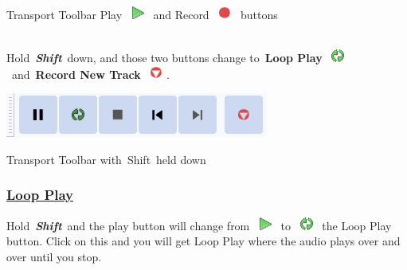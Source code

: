 \documentclass[letterpaper]{article}
\begin{document}
Transport Toolbar Play~ \includegraphics[width=0.423cm,height=0.423cm]{TourGuide-img001.png} ~and Record~
\includegraphics[width=0.423cm,height=0.423cm]{TourGuide-img002.png} ~buttons

{\color{black}
~\\
\newline
Hold~\textbf{\textit{Shift}}~down, and those two buttons change to~\textbf{Loop Play}~
\includegraphics[width=0.423cm,height=0.423cm]{TourGuide-img004.png} ~and~\textbf{Record New Track}~
\includegraphics[width=0.423cm,height=0.423cm]{TourGuide-img005.png} .}

 \includegraphics[width=8.652cm,height=1.455cm]{TourGuide-img006.png} 

Transport Toolbar with~Shift~held down

\subsubsection[Loop
Play]{\href{https://manual.audacityteam.org/man/playing_and_recording.html\#transport}{\textcolor[rgb]{0.3529412,0.21176471,0.5882353}{Loop
Play}}}
{\color{black}
Hold~\textbf{\textit{Shift}}~and the play button will change from~
\includegraphics[width=0.423cm,height=0.423cm]{TourGuide-img001.png} ~to~
\includegraphics[width=0.423cm,height=0.423cm]{TourGuide-img004.png} ~the Loop Play button. Click on this and you will
get Loop Play where the audio plays over and over until you stop.}
\end{document}
